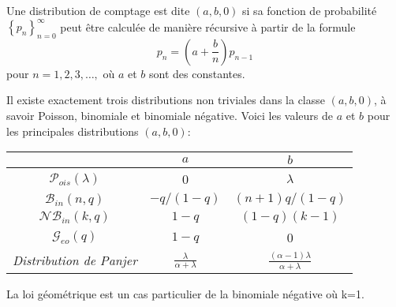 \begin{f}
	
	Une distribution de comptage est dite  \((a, b, 0)\) si sa fonction de probabilité \(\left\{p_{n}\right\}_{n=0}^{\infty}\) peut être calculée de manière récursive à partir de la formule
	\[
	p_{n}=\left(a+\frac{b}{n}\right) p_{n-1}
	\]
	pour \(n=1,2,3, \ldots,\) où \(a\) et \(b\) sont des constantes.
	
	Il existe exactement trois distributions non triviales dans la classe \((a, b, 0)\), à savoir Poisson, binomiale et binomiale négative. Voici les valeurs de \(a\) et \(b\) pour les principales distributions \((a, b, 0)\):
	\begin{center}
		\begin{tabular}{ccc} 
			& \(a\) & \(b\) \\
			\hline\(\mathcal{P}_{ois}(\lambda)\) & 0 & \(\lambda\) \\
			\(\mathcal{B}_{in}(n, q)\) & \(-q /(1-q)\) & \((n+1) q /(1-q)\) \\
			\(\mathcal{N}\mathcal{B}_{in}(k, q)\) & \(1-q\) & \((1-q)(k-1)\) \\
			\(\mathcal{G}_{eo}( q)\) & \(1-q\) & 0 \\
			\textit{    Distribution de Panjer} & \(\frac{\lambda}{\alpha+\lambda}\) &    \(\frac {(\alpha -1)\lambda }{\alpha +\lambda }\) \\
			\hline 
		\end{tabular}
		
	\end{center}
	
	{\small\color{OrangeProfondIRA} La loi géométrique est un cas particulier de la binomiale négative où k=1.}
\end{f}

